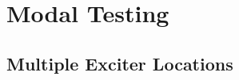 \documentclass[aspectratio=169,10pt]{beamer} \mode<presentation>
\newcommand{\R}{\mathbb{R}}
\DeclareMathOperator*{\argmin}{arg\,min}
\begin{document}





\section{Modal Testing}
\subsection{Multiple Exciter Locations}
\end{document}
